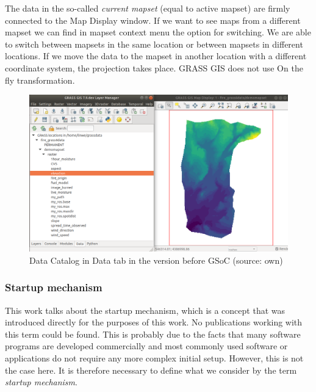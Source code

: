 \documentclass[a4paper,10pt,twoside]{article}
\begin{document}
The data in the so-called \textit{current mapset} (equal to active mapset) are firmly connected to the Map Display window. If we want to see maps from a different mapset we can find in mapset context menu the option for switching. We are able to switch between mapsets in the same location or between mapsets in different locations. If we move the data to the mapset in another location with a different coordinate system, the projection takes place. GRASS GIS does not use On the fly transformation.

\vspace{0.3cm}
\begin{figure}[hbt!] 
\begin{center}
\includegraphics[width=17cm]{../pictures/data_catalog_pred.png} 
\caption[Data Catalog in Data tab (version before GSoC)]{Data Catalog in Data tab in the version before GSoC (source: own)}
\label{fig:data_catalog_pred}
\end{center}
\end{figure}



\newpage
\vspace*{-1cm}
\subsubsection{Startup mechanism}
\label{section:mechanism}
\noindent
\large
This work talks about the startup mechanism, which is a concept that was introduced directly for the purposes of this work. No publications working with this term could be found. This is probably due to the facts that many software programs are developed commercially and most commonly used software or applications do not require any more complex initial setup. However, this is not the case here. It is therefore necessary to define what we consider by the term \textit{startup mechanism}.
\end{document}
